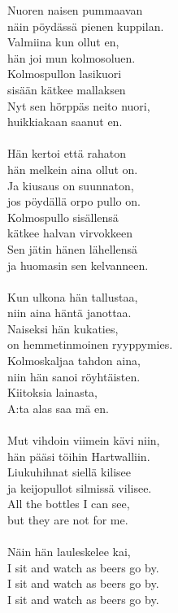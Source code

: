 
Nuoren naisen pummaavan \\ näin pöydässä pienen kuppilan. \\ Valmiina kun ollut en, \\ hän joi mun kolmosoluen. \\ Kolmospullon lasikuori \\ sisään kätkee mallaksen \\ Nyt sen hörppäs neito nuori, \\ huikkiakaan saanut en. \\ \hspace{10mm} \\ Hän kertoi että rahaton \\ hän melkein aina ollut on. \\ Ja kiusaus on suunnaton, \\ jos pöydällä orpo pullo on. \\ Kolmospullo sisällensä \\ kätkee halvan virvokkeen \\ Sen jätin hänen lähellensä \\ ja huomasin sen kelvanneen. \\ \hspace{10mm} \\ Kun ulkona hän tallustaa, \\ niin aina häntä janottaa. \\ Naiseksi hän kukaties, \\ on hemmetinmoinen ryyppymies. \\ Kolmoskaljaa tahdon aina, \\ niin hän sanoi röyhtäisten. \\ Kiitoksia lainasta, \\ A:ta alas saa mä en. \\ \hspace{10mm} \\ Mut vihdoin viimein kävi niin, \\ hän pääsi töihin Hartwalliin. \\ Liukuhihnat siellä kilisee \\ ja keijopullot silmissä vilisee. \\ All the bottles I can see, \\ but they are not for me. \\ \hspace{10mm} \\ Näin hän lauleskelee kai, \\ I sit and watch as beers go by. \\ I sit and watch as beers go by. \\ I sit and watch as beers go by.